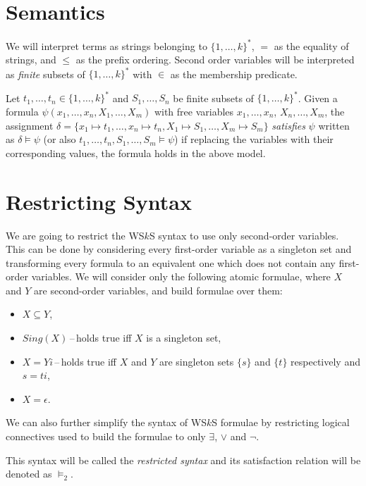   \section{Semantics}
	
We will interpret terms as strings belonging to $\{1,\ldots,k\}^*$, $=$ as the
equality of strings, and $\leq$ as the prefix ordering. Second order variables
will be interpreted as \emph{finite} subsets of $\{1,\ldots,k\}^*$ with
$\in$ as the membership predicate.
	
Let $t_1,\ldots,t_n \in \{1,\ldots,k\}^*$ and $S_1,\ldots,S_n$ be finite subsets
of $\{1,\ldots,k\}^*$. Given a formula $\psi(x_1,\ldots,x_n,X_1,\ldots,X_m)$
with free variables $x_1,\ldots,x_n$, $X_n,\ldots,X_m$, the assignment $\delta =
\{ x_1 \mapsto t_1,\ldots, x_n \mapsto t_n, X_1 \mapsto S_1,\ldots, X_m \mapsto
S_m\}$ \emph{satisfies} $\psi$ written as $\delta \models \psi$ (or also
$t_1,\ldots, t_n, S_1,\ldots,S_m \models \psi$) if replacing the variables with
their corresponding values, the formula holds in the above model.
	
  \section{Restricting Syntax}\label{restricted}
	We are going to restrict the WS$k$S syntax to use only second-order variables.
	This can be done by considering every first-order variable as a singleton set
	and transforming every formula to an equivalent one which does not contain any
	first-order variables. We will consider only the following atomic formulae,
	where $X$ and $Y$ are second-order variables, and build formulae over them:
	\begin{itemize}
	 \item $X \subseteq Y$,
\item $\mathit{Sing}(X)$\,--\,holds true iff $X$ is a singleton set, \item $X
= Yi$\,--\,holds true iff $X$ and $Y$ are singleton sets $\{s\}$ and $\{t\}$
respectively and $s = ti$,
	 \item $X = \epsilon$.
	\end{itemize}
	
We can also further simplify the syntax of WS$k$S formulae by restricting
logical connectives used to build the formulae to only $\exists$, $\vee$ and
$\neg$.
	
	 This syntax will be called
the \emph{restricted syntax} and its satisfaction relation will be denoted as
$\models_2$.


